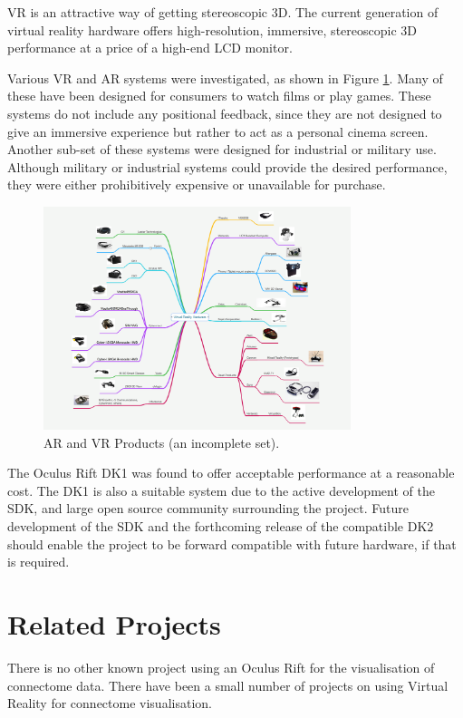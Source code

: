 \documentclass[MSc,paper=a4,pagesize=auto]{icldt}
\begin{document}
VR is an attractive way of getting stereoscopic 3D. The current generation of virtual reality hardware offers high-resolution, immersive, stereoscopic 3D performance at a price of a high-end LCD monitor. 

Various VR and AR systems were investigated, as shown in Figure \ref{fig:vr_headsets}. Many of these have been designed for consumers to watch films or play games. These systems do not include any positional feedback, since they are not designed to give an immersive experience but rather to act as a personal cinema screen. Another sub-set of these systems were designed for industrial or military use. Although military or industrial systems could provide the desired performance, they were either prohibitively expensive or unavailable for purchase. 

\begin{figure}[htbp!]
    \centering
    \includegraphics[width=0.8\textwidth]{resources/vr_headsets}
    \caption{AR and VR Products (an incomplete set).}
    \label{fig:vr_headsets}
\end{figure}

The Oculus Rift DK1 was found to offer acceptable performance at a reasonable cost. The DK1 is also a suitable system due to the active development of the SDK, and large open source community surrounding the project. Future development of the SDK and the forthcoming release of the compatible DK2 should enable the project to be forward compatible with future hardware, if that is required.
\section{Related Projects}
There is no other known project using an Oculus Rift for the visualisation of connectome data. There have been a small number of projects on using Virtual Reality for connectome visualisation. 
\end{document}
